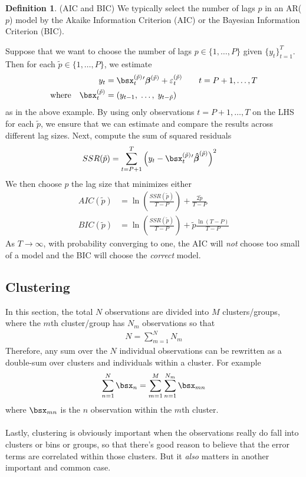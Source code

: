 \documentclass[12pt]{article}
\theoremstyle{plain}
\theoremstyle{definition}
\newtheorem{defn}[thm]{Definition}
\theoremstyle{remark}
\newcommand{\ra}{\rightarrow}
\newcommand{\bsbeta}{\boldsymbol{\beta}}
\newcommand{\bshatbeta}{\boldsymbol{\hat{\beta}}}
\newcommand{\nN}{_{n=1}^N}
\begin{document}
\begin{defn}(AIC and BIC)
We typically select the number of lags $p$ in an AR($p$) model by the
Akaike Information Criterion (AIC) or the Bayesian Information Criterion
(BIC).

Suppose that we want to choose the number of lags $p\in\{1,\ldots,P\}$
given $\{y_t\}_{t=1}^T$.
Then for each $\tilde{p}\in\{1,\ldots,P\}$, we estimate
\begin{align*}
  y_t &= \bsx_t^{(\tilde{p})} {}' \bsbeta^{(\tilde{p})}
  + \varepsilon_t^{(\tilde{p})}
  \qquad t=P+1,\ldots,T
  \\
  \text{where}\quad
  \bsx_t^{(\tilde{p})}
  &= (y_{t-1},\;\ldots,\;y_{t-\tilde{p}})
\end{align*}
as in the above example. By using only observations $t=P+1,\ldots,T$ on
the LHS for each $\tilde{p}$, we ensure that we can estimate and compare
the results across different lag sizes.
Next, compute the sum of squared residuals
\begin{align*}
  SSR(\tilde{p})
  &= \sum_{t=P+1}^T
  \left(y_t - \bsx_t^{(\tilde{p})}{}'\bshatbeta^{(\tilde{p})}\right)^2
\end{align*}
We then choose $p$ the lag size that minimizes either
\begin{align*}
  AIC(\tilde{p})
  &= \ln\left(\frac{SSR(\tilde{p})}{T-P}\right) + \frac{2\tilde{p}}{T-P}
  \\
  BIC(\tilde{p})
  &= \ln\left(\frac{SSR(\tilde{p})}{T-P}\right)
  + \tilde{p}\frac{\ln(T-P)}{T-P}
\end{align*}
As $T\ra\infty$, with probability converging to one, the AIC will
\emph{not} choose too small of a model and the BIC will choose the
\emph{correct} model.
\end{defn}



\clearpage
\subsection{Clustering}

In this section, the total $N$ observations are divided into $M$
clusters/groups, where the $m$th cluster/group has $N_m$ observations so
that
\begin{align*}
  N = \sum_{m=1}^N N_m
\end{align*}
Therefore, any sum over the $N$ individual observations can be rewritten
as a double-sum over clusters and individuals within a cluster. For
example
\begin{align}
  \sum\nN \bsx_n
  = \sum_{m=1}^M \sum_{n=1}^{N_m} \bsx_{mn}
  \label{clusterSums}
\end{align}
where $\bsx_{mn}$ is the $n$ observation within the $m$th cluster.
\\
\\
Lastly, clustering is obviously important when the observations really
do fall into clusters or bins or groups, so that there's good reason to
believe that the error terms are correlated within those clusters. But
it \emph{also} matters in another important and common case.
\end{document}
